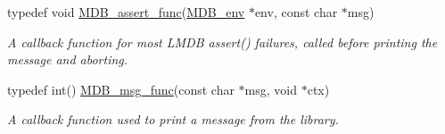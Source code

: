 \begin{DoxyCompactItemize}
typedef void \mbox{\hyperlink{group__mdb_ga949ada362b3e84ec0435197056d82371}{M\+D\+B\+\_\+assert\+\_\+func}}(\mbox{\hyperlink{struct_m_d_b__env}{M\+D\+B\+\_\+env}} $\ast$env, const char $\ast$msg)
\begin{DoxyCompactList}\small\item\em A callback function for most L\+M\+DB assert() failures, called before printing the message and aborting. \end{DoxyCompactList}\item 
typedef int() \mbox{\hyperlink{group__mdb_ga02f6d37e96b28c8feed7e467f3414863}{M\+D\+B\+\_\+msg\+\_\+func}}(const char $\ast$msg, void $\ast$ctx)
\begin{DoxyCompactList}\small\item\em A callback function used to print a message from the library. \end{DoxyCompactList}\end{DoxyCompactItemize}

